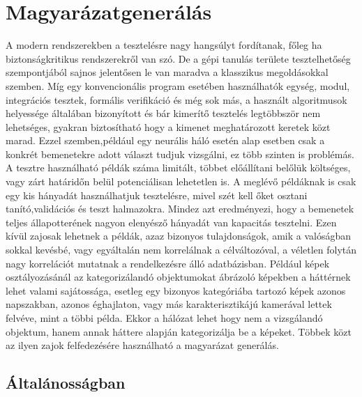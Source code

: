\chapter{Magyarázatgenerálás}\label{ch:exp}

A modern rendszerekben a tesztelésre nagy hangsúlyt fordítanak, főleg ha biztonságkritikus rendszerekről van szó. De a gépi tanulás területe tesztelhetőség szempontjából sajnos jelentősen le van maradva a klasszikus megoldásokkal szemben. Míg egy konvencionális program esetében használhatók egység, modul, integrációs tesztek, formális verifikáció és még sok más, a használt algoritmusok helyessége általában bizonyított és bár kimerítő tesztelés legtöbbször nem lehetséges, gyakran biztosítható hogy a kimenet meghatározott keretek közt marad. Ezzel szemben,például egy neurális háló esetén alap esetben csak a konkrét bemenetekre adott választ tudjuk vizsgálni, ez több szinten is problémás. A tesztre használható példák száma limitált, többet előállítani belőlük költséges, vagy zárt határidőn belül potenciálisan lehetetlen is. A meglévő példáknak is csak egy kis hányadát használhatjuk tesztelésre, mivel szét kell őket osztani tanító,validációs és teszt halmazokra. Mindez azt eredményezi, hogy a bemenetek teljes állapotterének nagyon elenyésző hányadát van kapacitás tesztelni. Ezen kívül zajosak lehetnek a példák, azaz bizonyos tulajdonságok, amik a valóságban sokkal kevésbé, vagy egyáltalán nem korrelálnak a célváltozóval, a véletlen folytán nagy korrelációt mutatnak a rendelkezésre álló adatbázisban. Például képek osztályozásánál az kategorizálandó objektumokat ábrázoló képekben a háttérnek lehet valami sajátossága, esetleg egy bizonyos kategóriába tartozó képek azonos napszakban, azonos éghajlaton, vagy más karakterisztikájú kamerával lettek felvéve, mint a többi példa. Ekkor a hálózat lehet hogy nem a vizsgálandó objektum, hanem annak háttere alapján kategorizálja be a képeket. Többek közt az ilyen zajok felfedezésére használható a magyarázat generálás.

\section{Általánosságban}

